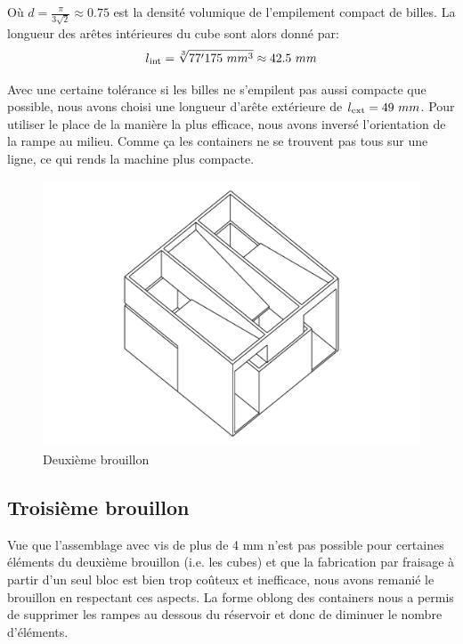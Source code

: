 Où \(d = \frac{ \pi }{3\sqrt{2}} \approx 0.75\) est la densité volumique de l'empilement compact de billes. La longueur des arêtes intérieures du cube sont alors donné par: 
\[l\textsubscript{int}=\sqrt[3]{77'175\ mm^3} \approx 42.5\ mm\]

Avec une certaine tolérance si les billes ne s'empilent pas aussi compacte que possible, nous avons choisi une longueur d'arête extérieure de \({l\textsubscript{ext}=49~mm}\). Pour utiliser le place de la manière la plus efficace, nous avons inversé l'orientation de la rampe au milieu. Comme ça les containers ne se trouvent pas tous sur une ligne, ce qui rends la machine plus compacte. 

\begin{figure}
    \centering
    \includegraphics[width=\textwidth]{Graphics/Reservoir_final/DEUXIEME_BROUILLON.pdf}
    \caption{Deuxième brouillon}
\end{figure}


\subsection{Troisième brouillon}
Vue que l'assemblage avec vis de plus de 4 mm n'est pas possible pour certaines  éléments du deuxième brouillon (i.e. les cubes) et que la fabrication par fraisage à partir d'un seul bloc est bien trop coûteux et inefficace, nous avons remanié le brouillon en respectant ces aspects. La forme oblong des containers nous a permis de supprimer les rampes au dessous du réservoir et donc de diminuer le nombre d'éléments.


